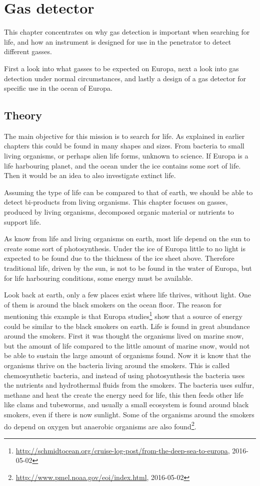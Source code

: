 \section{Gas detector}

This chapter concentrates on why gas detection is important when searching for life, and how an instrument is designed for use in the penetrator to detect different gasses.

First a look into what gasses to be expected on Europa, next a look into gas detection under normal circumstances, and lastly a design of a gas detector for specific use in the ocean of Europa.

\subsection{Theory}

The main objective for this mission is to search for life. As explained in earlier chapters this could be found in many shapes and sizes. From bacteria to small living organisms, or perhaps alien life forms, unknown to science. If Europa is a life harbouring planet, and the ocean under the ice contains some sort of life. Then it would be an idea to also investigate extinct life.

Assuming the type of life can be compared to that of earth, we should be able to detect bi-products from living organisms. This chapter focuses on gasses, produced by living organisms, decomposed organic material or nutrients to support life.

As know from life and living organisms on earth, most life depend on the sun to create some sort of photosynthesis. Under the ice of Europa little to no light is expected to be found due to the thickness of the ice sheet above. Therefore traditional life, driven by the sun, is not to be found in the water of Europa, but for life harbouring conditions, some energy must be available.

Look back at earth, only a few places exist where life thrives, without light. One of them is around the black smokers on the ocean floor. The reason for mentioning this example is that Europa studies\footnote{\url{http://schmidtocean.org/cruise-log-post/from-the-deep-sea-to-europa}, 2016-05-02} show that a source of energy could be similar to the black smokers on earth. Life is found in great abundance around the smokers. First it was thought the organisms lived on marine snow, but the amount of life compared to the little amount of marine snow, would not be able to sustain the large amount of organisms found. Now it is know that the organisms thrive on the bacteria living around the smokers. This is called chemosynthetic bacteria, and instead of using photosynthesis the bacteria uses the nutrients and hydrothermal fluids from the smokers. The bacteria uses sulfur, methane and heat the create the energy need for life, this then feeds other life like clams and tubeworms, and usually a small ecosystem is found around black smokers, even if there is now sunlight. Some of the organisms around the smokers do depend on oxygen but anaerobic organisms are also found\footnote{\url{http://www.pmel.noaa.gov/eoi/index.html}, 2016-05-02}.

